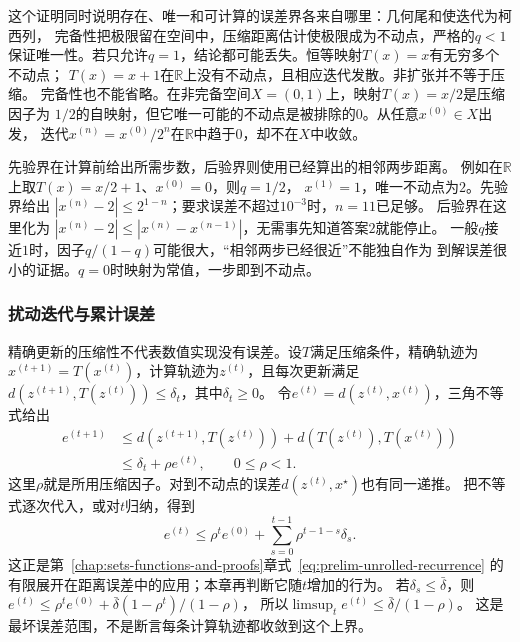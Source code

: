 这个证明同时说明存在、唯一和可计算的误差界各来自哪里：几何尾和使迭代为柯西列， 完备性把极限留在空间中，压缩距离估计使极限成为不动点，严格的$q<1$保证唯一性。若只允许$q=1$，结论都可能丢失。恒等映射$T(x)=x$有无穷多个不动点； $T(x)=x+1$在$\mathbb{R}$上没有不动点，且相应迭代发散。非扩张并不等于压缩。
完备性也不能省略。在非完备空间$X=(0,1)$上，映射$T(x)=x/2$是压缩因子为
$1/2$的自映射，但它唯一可能的不动点是被排除的$0$。从任意$x^{(0)}\in X$出发，
迭代$x^{(n)}=x^{(0)}/2^n$在$\mathbb{R}$中趋于$0$，却不在$X$中收敛。

先验界在计算前给出所需步数，后验界则使用已经算出的相邻两步距离。
例如在$\mathbb R$上取$T(x)=x/2+1$、$x^{(0)}=0$，则$q=1/2$，
$x^{(1)}=1$，唯一不动点为$2$。先验界给出
$|x^{(n)}-2|\leq2^{1-n}$；要求误差不超过$10^{-3}$时，$n=11$已足够。
后验界在这里化为
$|x^{(n)}-2|\leq|x^{(n)}-x^{(n-1)}|$，无需事先知道答案$2$就能停止。
一般$q$接近$1$时，因子$q/(1-q)$可能很大，“相邻两步已经很近”不能独自作为
到解误差很小的证据。$q=0$时映射为常值，一步即到不动点。

\subsubsection{扰动迭代与累计误差}
精确更新的压缩性不代表数值实现没有误差。设$T$满足压缩条件，精确轨迹为
$x^{(t+1)}=T(x^{(t)})$，计算轨迹为$z^{(t)}$，且每次更新满足
$d(z^{(t+1)},T(z^{(t)}))\leq\delta_t$，其中$\delta_t\geq0$。
令$e^{(t)}=d(z^{(t)},x^{(t)})$，三角不等式给出
\begin{equation}
 \begin{aligned}
 e^{(t+1)}
 &\leq d(z^{(t+1)},T(z^{(t)}))
       +d(T(z^{(t)}),T(x^{(t)}))\\
 &\leq\delta_t+\rho e^{(t)},\qquad 0\leq\rho<1.
 \end{aligned}
\label{eq:analysis-perturbed-distance-recursion}
\end{equation}
这里$\rho$就是所用压缩因子。对到不动点的误差$d(z^{(t)},x^\star)$也有同一递推。
把不等式逐次代入，或对$t$归纳，得到
\begin{equation}
 e^{(t)}
 \leq \rho^t e^{(0)}
       +\sum_{s=0}^{t-1}\rho^{t-1-s}\delta_s.
\label{eq:analysis-perturbed-distance-unrolling}
\end{equation}
这正是第~\ref{chap:sets-functions-and-proofs}章式~\eqref{eq:prelim-unrolled-recurrence}
的有限展开在距离误差中的应用；本章再判断它随$t$增加的行为。
若$\delta_s\leq\bar\delta$，则
$e^{(t)}\leq\rho^t e^{(0)}+\bar\delta(1-\rho^t)/(1-\rho)$，
所以$\limsup_t e^{(t)}\leq\bar\delta/(1-\rho)$。
这是最坏误差范围，不是断言每条计算轨迹都收敛到这个上界。


